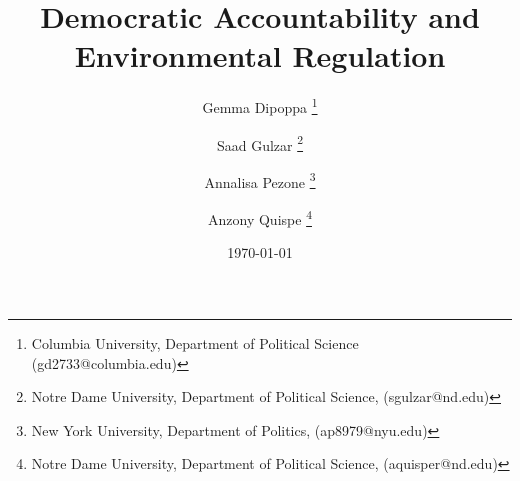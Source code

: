 \documentclass[12pt]{article}
\title{Democratic Accountability and Environmental Regulation}
\author{
Gemma Dipoppa \thanks{Columbia University, Department of Political Science (gd2733@columbia.edu)} 
\and Saad Gulzar \thanks{Notre Dame University, Department of Political Science, (sgulzar@nd.edu)} \and Annalisa Pezone \thanks{New York University, Department of Politics, (ap8979@nyu.edu)} 
\and Anzony Quispe \thanks{Notre Dame University, Department of Political Science, (aquisper@nd.edu)} 
}
\date{\today}
\begin{document}
\setcounter{page}{0}
	\maketitle
	\thispagestyle{empty}
	
	
	\begin{singlespace}
\begin{abstract}



\end{abstract}
\end{singlespace}
\end{document}
